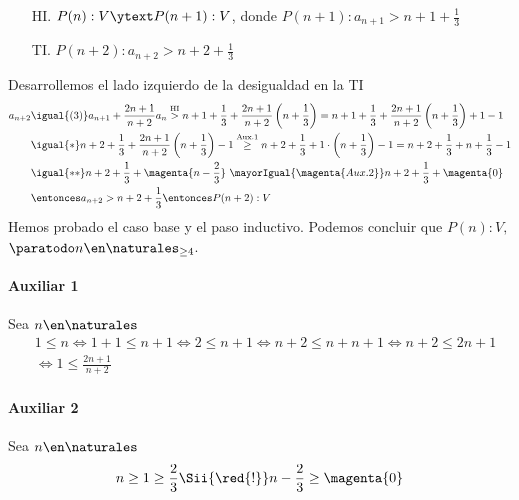 \begin{enumerate}[label=\roman*)]
        \begin{enumerate}
          \item[HI.] $P(n):V \ytext P(n+1):V$, donde $P(n+1): a_{n+1} > n + 1 + \displaystyle \frac{1}{3}$
          \item[TI.] $P(n+2): a_{n+2} > n + 2 + \displaystyle \frac{1}{3}$
        \end{enumerate}
        Desarrollemos el lado izquierdo de la desigualdad en la TI
        \begin{align*}
          a_{n+2} & \igual{(3)} a_{n+1} + \frac{2n+1}{n+2}a_n \overset{\text{HI}}{>}
          n + 1 + \frac{1}{3} + \frac{2n+1}{n+2}\left(n + \frac{1}{3}\right)
          = n + 1 + \frac{1}{3} + \frac{2n+1}{n+2}\left(n + \frac{1}{3}\right) + 1 - 1                                                          \\
                  & \igual{*} n + 2 + \frac{1}{3} + \frac{2n+1}{n+2}\left(n + \frac{1}{3}\right) - 1
          \overset{\text{Aux.1}}{\geq} n + 2 + \frac{1}{3} + 1 \cdot \left(n + \frac{1}{3}\right) - 1
          = n + 2 + \frac{1}{3} + n + \frac{1}{3} - 1                                                                                           \\
                  & \igual{**} n + 2 + \frac{1}{3} + \magenta{n - \frac{2}{3}} \ \mayorIgual{\magenta{Aux.2}} n + 2 + \frac{1}{3} + \magenta{0} \\
                  & \entonces a_{n+2} > n + 2 + \frac{1}{3} \entonces P(n+2):V
        \end{align*}
        Hemos probado el caso base y el paso inductivo. Podemos concluir que $P(n):V,$ $\paratodo n \en \naturales _{\geq 4}$.

        \paragraph{Auxiliar 1}{Sea $n \en \naturales $
          \begin{align*}
             & 1 \leq n \iff 1 + 1 \leq n + 1 \iff 2 \leq n + 1 \iff n + 2 \leq n + n + 1 \iff n + 2 \leq 2n + 1 \\
             & \iff 1 \leq \frac{2n+1}{n+2}
          \end{align*}
        }

        \paragraph{Auxiliar 2}{Sea $n \en \naturales $
          \begin{align*}
            n \geq  1 \geq  \frac{2}{3}
            \Sii{\red{!}}
            n - \frac{2}{3} \geq \magenta{0}
          \end{align*}
        }

\end{enumerate}

\begin{aportes}
  \item {}
  \item {}
\end{aportes}
